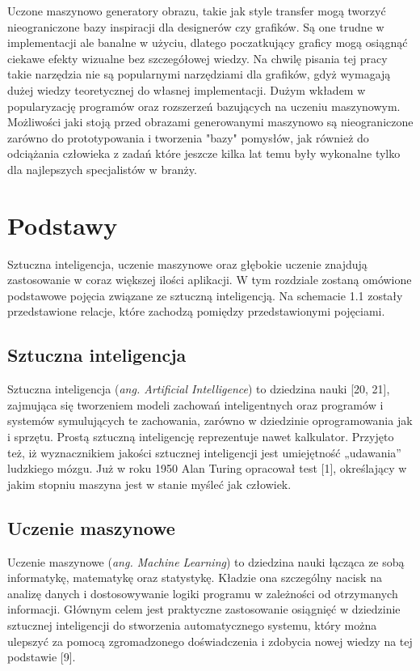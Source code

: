\documentclass[brudnopis]{xmgr}
\begin{document}
 Uczone maszynowo generatory obrazu, takie jak style transfer mogą tworzyć nieograniczone bazy inspiracji dla designerów czy grafików. Są one trudne w implementacji ale banalne w użyciu, dlatego poczatkujący graficy mogą osiągnąć ciekawe efekty wizualne bez szczegółowej wiedzy. Na chwilę pisania tej pracy takie narzędzia nie są popularnymi narzędziami dla grafików, gdyż wymagają dużej wiedzy teoretycznej do własnej implementacji. Dużym wkładem w popularyzację programów oraz rozszerzeń bazujących na uczeniu maszynowym. Możliwości jaki stoją przed obrazami generowanymi maszynowo są nieograniczone zarówno do prototypowania i tworzenia "bazy" pomysłów, jak również do odciążania człowieka z zadań które jeszcze kilka lat temu były wykonalne tylko dla najlepszych specjalistów w branży.


\chapter{Podstawy\label{s:dtd}}

Sztuczna inteligencja, uczenie maszynowe oraz głębokie uczenie znajdują zastosowanie w coraz większej ilości aplikacji. W tym rozdziale zostaną omówione podstawowe pojęcia związane ze sztuczną inteligencją. Na schemacie 1.1 zostały przedstawione relacje, które zachodzą pomiędzy przedstawionymi pojęciami.

\section{Sztuczna inteligencja}

Sztuczna inteligencja (\textit{ang. Artificial Intelligence}) to dziedzina nauki [20, 21], zajmująca się tworzeniem modeli zachowań inteligentnych oraz programów i systemów symulujących te zachowania, zarówno w dziedzinie oprogramowania jak i sprzętu. Prostą sztuczną inteligencję reprezentuje nawet kalkulator. Przyjęto też, iż wyznacznikiem jakości sztucznej inteligencji jest umiejętność „udawania” ludzkiego mózgu. Już w roku 1950 Alan Turing opracował test [1], określający w jakim stopniu maszyna jest w stanie myśleć jak człowiek.



\section{Uczenie maszynowe}

Uczenie maszynowe (\textit{ang. Machine Learning}) to dziedzina nauki łącząca ze sobą informatykę, matematykę oraz statystykę. Kładzie ona szczególny nacisk na analizę danych i dostosowywanie logiki programu w zależności od otrzymanych informacji. Głównym celem jest praktyczne zastosowanie osiągnięć w dziedzinie sztucznej inteligencji do stworzenia automatycznego systemu, który można ulepszyć za pomocą zgromadzonego doświadczenia i zdobycia nowej wiedzy na tej podstawie [9].
\end{document}
